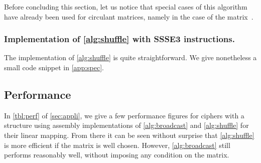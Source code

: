\medskip

Before concluding this section, let us notice that special cases of this algorithm have already been used for circulant matrices, namely in the case of the \AES{} \mc{} matrix~\cite{hamburg}.

\subsubsection{Implementation of \autoref{alg:shuffle} with SSSE3 instructions.}

The implementation of \autoref{alg:shuffle} is quite straightforward. We give nonetheless a small code snippet in \autoref{app:spec}.

\subsection{Performance}

In \autoref{tbl:perf} of \autoref{sec:appli}, we give a few performance figures for ciphers with a \shark{} structure using assembly implementations of \autoref{alg:broadcast} and \autoref{alg:shuffle}  for their linear mapping.
From there it can be seen without surprise that \autoref{alg:shuffle} is more efficient if the matrix is well chosen. However, \autoref{alg:broadcast}
still performs reasonably well, without imposing any condition on the matrix.
